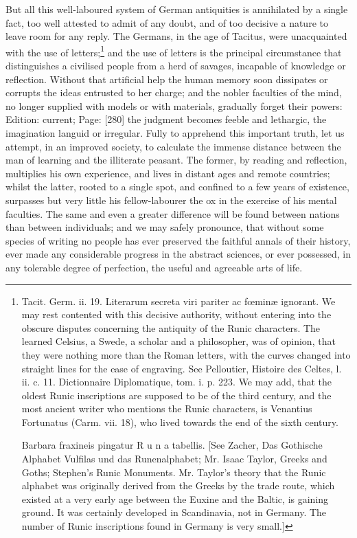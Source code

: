 But all this well-laboured system of German antiquities is annihilated by a single fact, too well attested to admit of any doubt, and of too decisive a nature to leave room for any reply. The Germans, in the age of Tacitus, were unacquainted with the use of letters;\footnote{Tacit. Germ. ii. 19. Literarum secreta viri pariter ac fœminæ ignorant. We may rest contented with this decisive authority, without entering into the obscure disputes concerning the antiquity of the Runic characters. The learned Celsius, a Swede, a scholar and a philosopher, was of opinion, that they were nothing more than the Roman letters, with the curves changed into straight lines for the ease of engraving. See Pelloutier, Histoire des Celtes, l. ii. c. 11. Dictionnaire Diplomatique, tom. i. p. 223. We may add, that the oldest Runic inscriptions are supposed to be of the third century, and the most ancient writer who mentions the Runic characters, is Venantius Fortunatus (Carm. vii. 18), who lived towards the end of the sixth century.

Barbara fraxineis pingatur R u n a tabellis. [See Zacher, Das Gothische Alphabet Vulfilas und das Runenalphabet; Mr. Isaac Taylor, Greeks and Goths; Stephen\texthebrew{}’s Runic Monuments. Mr. Taylor\texthebrew{}’s theory that the Runic alphabet was originally derived from the Greeks by the trade route, which existed at a very early age between the Euxine and the Baltic, is gaining ground. It was certainly developed in Scandinavia, not in Germany. The number of Runic inscriptions found in Germany is very small.]} and the use of letters is the principal circumstance that distinguishes a civilised people from a herd of savages, incapable of knowledge or reflection. Without that artificial help the human memory soon dissipates or corrupts the ideas entrusted to her charge; and the nobler faculties of the mind, no longer supplied with models or with materials, gradually forget their powers: Edition: current; Page: [280] the judgment becomes feeble and lethargic, the imagination languid or irregular. Fully to apprehend this important truth, let us attempt, in an improved society, to calculate the immense distance between the man of learning and the illiterate peasant. The former, by reading and reflection, multiplies his own experience, and lives in distant ages and remote countries; whilst the latter, rooted to a single spot, and confined to a few years of existence, surpasses but very little his fellow-labourer the ox in the exercise of his mental faculties. The same and even a greater difference will be found between nations than between individuals; and we may safely pronounce, that without some species of writing no people has ever preserved the faithful annals of their history, ever made any considerable progress in the abstract sciences, or ever possessed, in any tolerable degree of perfection, the useful and agreeable arts of life.

